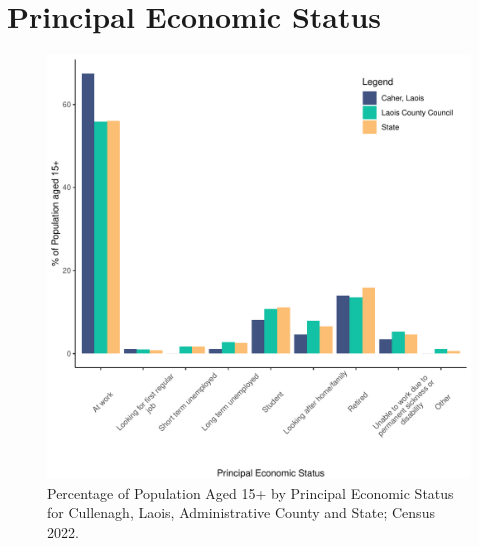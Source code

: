 \documentclass{article}
\begin{document}
  
\pagebreak
\section{Principal Economic Status}\label{sect:PES}
\begin{figure}[H]
	\centering
	\includegraphics[width = 140mm]{../figures/PESED.pdf}
	\caption{Percentage of Population Aged 15+ by Principal Economic Status for Cullenagh, Laois, Administrative County and State; Census 2022.}
	\label{fig:vbnv}
	\end{figure}
\end{document}
